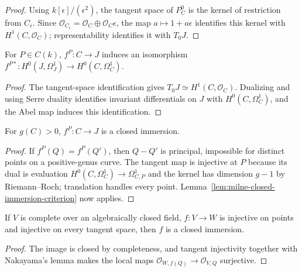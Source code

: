 \begin{proof}

Using $k[\epsilon]/(\epsilon^2)$, the tangent space of $P_C^0$ is the kernel of restriction from $C_\epsilon$. Since $\mathcal O_{C_\epsilon}=\mathcal O_C\oplus\mathcal O_C\epsilon$, the map $a\mapsto1+a\epsilon$ identifies this kernel with $H^1(C,\mathcal O_C)$; representability identifies it with $T_0J$.

\end{proof}

\begin{proposition}\label{prop:milne-abel-differentials}
For $P\in C(k)$, $f^P:C\to J$ induces an isomorphism $f^{P*}:H^0(J,\Omega_J^1)\to H^0(C,\Omega_C^1)$.
\end{proposition}
\begin{proof}
The tangent-space identification gives $T_0J\simeq H^1(C,\mathcal O_C)$.
Dualizing and using Serre duality identifies invariant differentials on $J$
with $H^0(C,\Omega_C^1)$, and the Abel map induces this identification.
\end{proof}
\begin{proposition}\label{prop:milne-abel-closed-immersion}
For $g(C)>0$, $f^P:C\to J$ is a closed immersion.
\end{proposition}

\begin{proof}

If $f^P(Q)=f^P(Q')$, then $Q-Q'$ is principal, impossible for distinct points on a positive-genus curve. The tangent map is injective at $P$ because its dual is evaluation $H^0(C,\Omega_C^1)\to\Omega_{C,P}^1$ and the kernel has dimension $g-1$ by Riemann--Roch; translation handles every point. Lemma~\ref{lem:milne-closed-immersion-criterion} now applies.

\end{proof}

\begin{lemma}\label{lem:milne-closed-immersion-criterion}
If $V$ is complete over an algebraically closed field, $f:V\to W$ is injective on points and injective on every tangent space, then $f$ is a closed immersion.
\end{lemma}

\begin{proof}

The image is closed by completeness, and tangent injectivity together with Nakayama's lemma makes the local maps $\mathcal O_{W,f(Q)}\to\mathcal O_{V,Q}$ surjective.

\end{proof}

